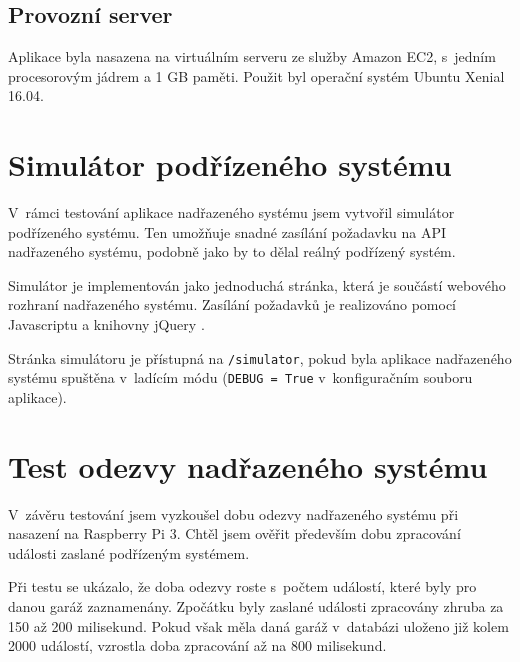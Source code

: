 

\subsection{Provozní server}

Aplikace byla nasazena na virtuálním serveru ze služby Amazon EC2, s~jedním procesorovým jádrem a 1 GB paměti. Použit byl operační systém Ubuntu Xenial 16.04.

\section{Simulátor podřízeného systému}
\label{sec:te_sim}

V~rámci testování aplikace nadřazeného systému jsem vytvořil simulátor podřízeného systému. Ten umožňuje snadné zasílání požadavku na API nadřazeného systému, podobně jako by to dělal reálný podřízený systém.

Simulátor je implementován jako jednoduchá stránka, která je součástí webového rozhraní nadřazeného systému. Zasílání požadavků je realizováno pomocí Javascriptu a knihovny jQuery \cite{jquery_about}. 

Stránka simulátoru je přístupná na \texttt{/simulator}, pokud byla aplikace nadřazeného systému spuštěna v~ladícím módu (\texttt{DEBUG = True} v~konfiguračním souboru aplikace).

\section{Test odezvy nadřazeného systému}
\label{sec:te_lat}

V~závěru testování jsem vyzkoušel dobu odezvy nadřazeného systému při nasazení na Raspberry Pi 3. Chtěl jsem ověřit především dobu zpracování události zaslané podřízeným systémem.

Při testu se ukázalo, že doba odezvy roste s~počtem událostí, které byly pro danou garáž zaznamenány. Zpočátku byly zaslané události zpracovány zhruba za 150 až 200 milisekund. Pokud však měla daná garáž v~databázi uloženo již kolem 2000 událostí, vzrostla doba zpracování až na 800 milisekund.

